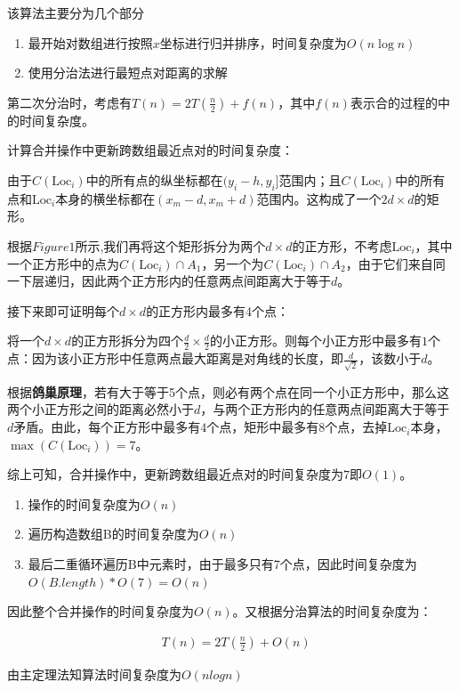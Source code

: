 \documentclass{article}
\begin{document}
该算法主要分为几个部分

\begin{enumerate}
    \item 最开始对数组进行按照$x$坐标进行归并排序，时间复杂度为$O(n\log n)$
    \item 使用分治法进行最短点对距离的求解
\end{enumerate}

第二次分治时，考虑有$T(n) = 2T(\frac{n}{2}) + f(n)$，其中$f(n)$表示合的过程的中的时间复杂度。

计算合并操作中更新跨数组最近点对的时间复杂度：

由于$C(\text{Loc}_i)$中的所有点的纵坐标都在$(y_i-h,y_i]$范围内；且$C(\text{Loc}_i)$中的所有点和$\text{Loc}_i$本身的横坐标都在$(x_m-d,x_m+d)$范围内。这构成了一个$2d\times d$的矩形。

根据$Figure1$所示,我们再将这个矩形拆分为两个$d\times d$的正方形，不考虑$\text{Loc}_i$，其中一个正方形中的点为$C(\text{Loc}_i)\cap A_1$，另一个为$C(\text{Loc}_i)\cap A_2$，由于它们来自同一下层递归，因此两个正方形内的任意两点间距离大于等于$d$。

接下来即可证明每个$d\times d$的正方形内最多有4个点：

将一个$d\times d$的正方形拆分为四个$\frac{d}{2}\times\frac{d}{2}$的小正方形。则每个小正方形中最多有$1$个点：因为该小正方形中任意两点最大距离是对角线的长度，即$\frac{d}{\sqrt 2}$，该数小于$d$。

根据\textbf{鸽巢原理}，若有大于等于5个点，则必有两个点在同一个小正方形中，那么这两个小正方形之间的距离必然小于$d$，与两个正方形内的任意两点间距离大于等于$d$矛盾。由此，每个正方形中最多有$4$个点，矩形中最多有$8$个点，去掉$\text{Loc}_i$本身，$\max(C(\text{Loc}_i))=7$。

综上可知，合并操作中，更新跨数组最近点对的时间复杂度为$7$即$O(1)$。

\begin{enumerate}
    \item {}操作的时间复杂度为$O(n)$
    \item 遍历构造数组B的时间复杂度为$O(n)$
    \item 最后二重循环遍历B中元素时，由于最多只有7个点，因此时间复杂度为$O(B.length)*O(7) = O(n)$
\end{enumerate}

因此整个合并操作的时间复杂度为$O(n)$。又根据分治算法的时间复杂度为：

\begin{align*}   
    &T(n) = 2T(\frac{n}{2}) + O(n)
\end{align*}

由主定理法知算法时间复杂度为$O(nlogn)$
\end{document}
